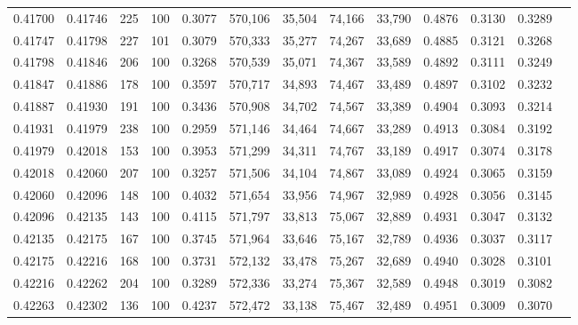 \begin{tabular}{rrrrrrrrrrrrr}
0.41700 & 0.41746 &   225 & 100 &                                     0.3077 & 570,106 &  35,504 &  74,166 &  33,790 & 0.4876 & 0.3130 & 0.3289 \\
0.41747 & 0.41798 &   227 & 101 &                                     0.3079 & 570,333 &  35,277 &  74,267 &  33,689 & 0.4885 & 0.3121 & 0.3268 \\
0.41798 & 0.41846 &   206 & 100 &                                     0.3268 & 570,539 &  35,071 &  74,367 &  33,589 & 0.4892 & 0.3111 & 0.3249 \\
0.41847 & 0.41886 &   178 & 100 &                                     0.3597 & 570,717 &  34,893 &  74,467 &  33,489 & 0.4897 & 0.3102 & 0.3232 \\
0.41887 & 0.41930 &   191 & 100 &                                     0.3436 & 570,908 &  34,702 &  74,567 &  33,389 & 0.4904 & 0.3093 & 0.3214 \\
0.41931 & 0.41979 &   238 & 100 &                                     0.2959 & 571,146 &  34,464 &  74,667 &  33,289 & 0.4913 & 0.3084 & 0.3192 \\
0.41979 & 0.42018 &   153 & 100 &                                     0.3953 & 571,299 &  34,311 &  74,767 &  33,189 & 0.4917 & 0.3074 & 0.3178 \\
0.42018 & 0.42060 &   207 & 100 &                                     0.3257 & 571,506 &  34,104 &  74,867 &  33,089 & 0.4924 & 0.3065 & 0.3159 \\
0.42060 & 0.42096 &   148 & 100 &                                     0.4032 & 571,654 &  33,956 &  74,967 &  32,989 & 0.4928 & 0.3056 & 0.3145 \\
0.42096 & 0.42135 &   143 & 100 &                                     0.4115 & 571,797 &  33,813 &  75,067 &  32,889 & 0.4931 & 0.3047 & 0.3132 \\
0.42135 & 0.42175 &   167 & 100 &                                     0.3745 & 571,964 &  33,646 &  75,167 &  32,789 & 0.4936 & 0.3037 & 0.3117 \\
0.42175 & 0.42216 &   168 & 100 &                                     0.3731 & 572,132 &  33,478 &  75,267 &  32,689 & 0.4940 & 0.3028 & 0.3101 \\
0.42216 & 0.42262 &   204 & 100 &                                     0.3289 & 572,336 &  33,274 &  75,367 &  32,589 & 0.4948 & 0.3019 & 0.3082 \\
0.42263 & 0.42302 &   136 & 100 &                                     0.4237 & 572,472 &  33,138 &  75,467 &  32,489 & 0.4951 & 0.3009 & 0.3070 \\

\end{tabular}
